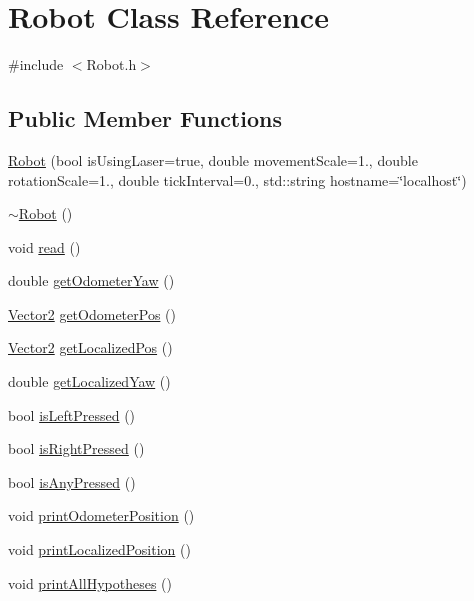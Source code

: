 \hypertarget{classRobot}{}\section{Robot Class Reference}
\label{classRobot}


{\ttfamily \#include $<$Robot.\+h$>$}

\subsection*{Public Member Functions}
\begin{DoxyCompactItemize}
\item 
\hyperlink{classRobot_ae488529a62015b970689420a1c1e04c9}{Robot} (bool is\+Using\+Laser=true, double movement\+Scale=1., double rotation\+Scale=1., double tick\+Interval=0., std\+::string hostname=\char`\"{}localhost\char`\"{})
\item 
\hyperlink{classRobot_a924320124b09c2f2ac1621aa210d5f38}{$\sim$\+Robot} ()
\item 
void \hyperlink{classRobot_a101cfa860e4b67d9f9f4f14a0487a57a}{read} ()
\item 
double \hyperlink{classRobot_a3b0bee526dcdfd730e919abd4f3898b1}{get\+Odometer\+Yaw} ()
\item 
\hyperlink{structVector2}{Vector2} \hyperlink{classRobot_a3d023c3f1c9f775711cf2e86cc9798f0}{get\+Odometer\+Pos} ()
\item 
\hyperlink{structVector2}{Vector2} \hyperlink{classRobot_acc2d5b3e769301c80217134a52d44c4f}{get\+Localized\+Pos} ()
\item 
double \hyperlink{classRobot_a7c0ff2fc5e195e8e8aaf566cfca78db9}{get\+Localized\+Yaw} ()
\item 
bool \hyperlink{classRobot_a3b33d92fbb96a9dc1c1eb7e2b776be38}{is\+Left\+Pressed} ()
\item 
bool \hyperlink{classRobot_acb4caaf0af89fd69fcc0396e79690a39}{is\+Right\+Pressed} ()
\item 
bool \hyperlink{classRobot_a71db47948a4fc61791ffa789033bfac4}{is\+Any\+Pressed} ()
\item 
void \hyperlink{classRobot_a4452b7eccd579684594669b97af8a64a}{print\+Odometer\+Position} ()
\item 
void \hyperlink{classRobot_a1a53d881a3efe4825b2685951345bfcf}{print\+Localized\+Position} ()
\item 
void \hyperlink{classRobot_aa603bab25b52c7375bff845f6a891fc4}{print\+All\+Hypotheses} ()
\item 

\end{DoxyCompactItemize}

